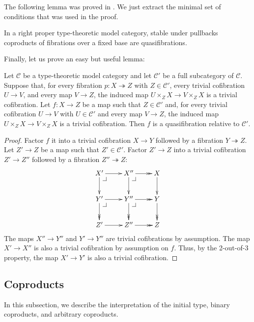 \documentclass[reqno]{amsart}
\makeatletter
\theoremstyle{definition}
\theoremstyle{remark}
\newcommand{\scat}[1]{\mathcal{#1}}
\numberwithin{figure}{section}
\newcommand{\pb}[1][dr]{\save*!/#1-1.2pc/#1:(-1,1)@^{|-}\restore}
\makeatother
\begin{document}
The following lemma was proved in \cite[Theorem~3.3]{lum-shul-hits}.
We just extract the minimal set of conditions that was used in the proof.

\begin{lem}[quasifib]
In a right proper type-theoretic model category, stable under pullbacks coproducts of fibrations over a fixed base are quasifibrations.
\end{lem}

Finally, let us prove an easy but useful lemma:

\begin{lem}
Let $\scat{C}$ be a type-theoretic model category and let $\scat{C}'$ be a full subcategory of $\scat{C}$.
Suppose that, for every fibration $p : X \twoheadrightarrow Z$ with $Z \in \scat{C}'$, every trivial cofibration $U \to V$, and every map $V \to Z$, the induced map $U \times_Z X \to V \times_Z X$ is a trivial cofibration.
Let $f : X \to Z$ be a map such that $Z \in \scat{C}'$ and, for every trivial cofibration $U \to V$ with $U \in \scat{C}'$ and every map $V \to Z$, the induced map $U \times_Z X \to V \times_Z X$ is a trivial cofibration.
Then $f$ is a quasifibration relative to $\scat{C}'$.
\end{lem}
\begin{proof}
Factor $f$ it into a trivial cofibration $X \to Y$ followed by a fibration $Y \twoheadrightarrow Z$.
Let $Z' \to Z$ be a map such that $Z' \in \scat{C}'$.
Factor $Z' \to Z$ into a trivial cofibration $Z' \to Z''$ followed by a fibration $Z'' \twoheadrightarrow Z$:
\[ \xymatrix{ X' \ar[r] \ar[d] \pb          & X'' \ar@{->>}[r] \ar[d] \pb       & X \ar[d] \\
              Y' \ar[r] \ar@{->>}[d] \pb    & Y'' \ar@{->>}[r] \ar@{->>}[d] \pb & Y \ar@{->>}[d] \\
              Z' \ar[r]                     & Z'' \ar@{->>}[r]                  & Z
            } \]
The maps $X'' \to Y''$ and $Y' \to Y''$ are trivial cofibrations by assumption.
The map $X' \to X''$ is also a trivial cofibration by assumption on $f$.
Thus, by the 2-out-of-3 property, the map $X' \to Y'$ is also a trivial cofibration.
\end{proof}

\subsection{Coproducts}

In this subsection, we describe the interpretation of the initial type, binary coproducts, and arbitrary coproducts.
\end{document}
